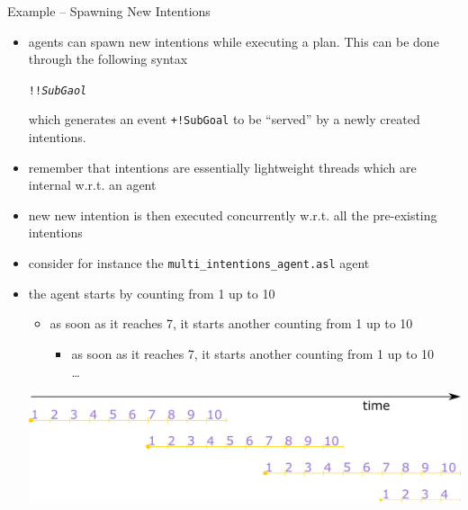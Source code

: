 \documentclass[presentation]{beamer}\mode<presentation>{\usetheme{AMSBolognaFC}}
\begin{document}
\begin{frame}[c, allowframebreaks]{Example \theJasonExample{} -- Spawning New Intentions}
    \begin{itemize}
        \item \jason{} agents can spawn new intentions while executing a plan.
        This can be done through the following syntax
        \begin{center}
            \texttt{\alert{!!}\textit{SubGaol}}
        \end{center}
        which generates an event \texttt{+!SubGoal} to be ``served'' by a newly created intentions.
        
        \vspace{.3cm}
        
        \item remember that intentions are essentially lightweight threads which are internal w.r.t. an agent
        
        \vspace{.3cm}
        
        \item new new intention is then executed concurrently w.r.t. all the pre-existing intentions
        
        \framebreak
        
        \item consider for instance the \texttt{multi\_intentions\_agent.asl} agent
        
        
        \framebreak
        
        \item the agent starts by counting from 1 up to 10
        \begin{itemize}
            \item as soon as it reaches 7, it starts another counting from 1 up to 10
            \begin{itemize}
                \item as soon as it reaches 7, it starts another counting from 1 up to 10
                \\
                \hspace{.5cm} \ldots{}
            \end{itemize}
        \end{itemize}
        \begin{center}
            \includegraphics[width=\linewidth]{figures/multi-intentions.pdf}
        \end{center}
        

\end{itemize}
\end{frame}
\end{document}
